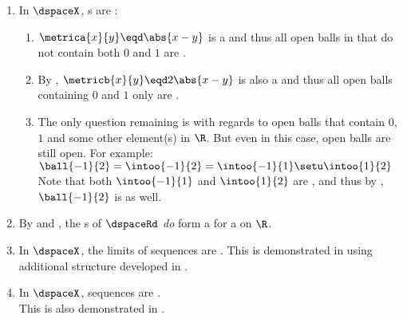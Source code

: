 \begin{example}
\begin{enumerate}
  \item In $\dspaceX$, s are : \label{item:dspace_21_oballo}
    \begin{enumerate}
      \item $\metrica{x}{y}\eqd\abs{x-y}$ is a  and thus all open balls in that do not contain both $0$ and $1$ are .
      \item By , $\metricb{x}{y}\eqd2\abs{x-y}$ is also a  and thus all open balls containing $0$ and $1$ only are .
      \item The only question remaining is with regards to open balls that contain $0$, $1$ and some other element(s) in $\R$.
            But even in this case, open balls are still open. For example:
        \\\indentx$\ball{-1}{2} = \intoo{-1}{2} = \intoo{-1}{1}\setu\intoo{1}{2}$\\
        Note that both $\intoo{-1}{1}$ and $\intoo{1}{2}$ are , and thus by ,
        $\ball{-1}{2}$ is  as well.
    \end{enumerate}

  \item By  and , 
        the s of $\dspaceRd$ \emph{do} form a  for a  on $\R$.

  \item In $\dspaceX$, the limits of  sequences are .
        This is demonstrated in  using additional structure developed in .

  \item In $\dspaceX$,  sequences are .\\
        This is also demonstrated in .

\end{enumerate}
\end{example}

